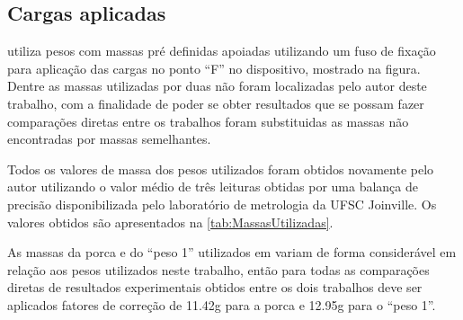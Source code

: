 \subsection{Cargas aplicadas}

\autocite{Minela2017} utiliza pesos com massas pré definidas apoiadas utilizando um fuso de fixação para aplicação das cargas no ponto “F” no dispositivo, mostrado na figura.
Dentre as massas utilizadas por \autocite{Minela2017} duas não foram localizadas pelo autor deste trabalho, com a finalidade de poder se obter resultados que se possam fazer
comparações diretas entre os trabalhos foram substituidas as massas não encontradas por massas semelhantes.

Todos os valores de massa dos pesos utilizados foram obtidos novamente pelo autor utilizando o valor médio de três leituras obtidas por uma balança de precisão disponibilizada pelo laboratório de metrologia
da UFSC Joinville. Os valores obtidos são apresentados na \autoref{tab:MassasUtilizadas}.

\begin{table}[!ht]
    \caption{Valores de massas utilizadas para aplicação das cargas nos dispositivos de flexão e torção}
    \label{tab:MassasUtilizadas}
    \centering
\end{table}

As massas da porca e do “peso 1” utilizados em \autocite{Minela2017} variam de forma considerável em relação aos pesos utilizados neste trabalho, então para todas as comparações diretas de
resultados experimentais obtidos entre os dois trabalhos deve ser aplicados fatores de correção de 11.42g para a porca e 12.95g para o “peso 1”.

